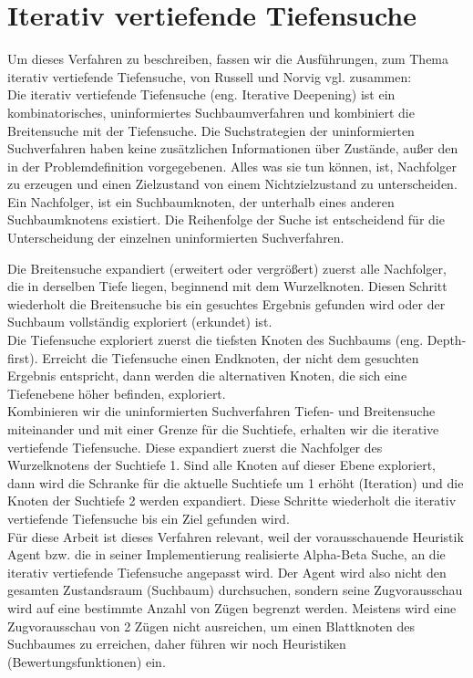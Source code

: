 \section{Iterativ vertiefende Tiefensuche}
\label{sec:Iterativ vertiefende Tiefensuche}
Um dieses Verfahren zu beschreiben, fassen wir die Ausführungen, zum Thema iterativ vertiefende Tiefensuche, von Russell und Norvig vgl. \cite[116]{Russell} zusammen:\\

Die iterativ vertiefende Tiefensuche (eng. Iterative Deepening) ist ein kombinatorisches, uninformiertes Suchbaumverfahren und kombiniert die Breitensuche mit der Tiefensuche. Die Suchstrategien der uninformierten Suchverfahren haben keine zusätzlichen Informationen über Zustände, außer den in der Problemdefinition vorgegebenen. Alles was sie tun können, ist, Nachfolger zu erzeugen und einen Zielzustand von einem Nichtzielzustand zu unterscheiden. Ein Nachfolger, ist ein Suchbaumknoten, der unterhalb eines anderen Suchbaumknotens existiert. Die Reihenfolge der Suche ist entscheidend für die Unterscheidung der einzelnen uninformierten Suchverfahren. \\
\newpage
 
Die Breitensuche expandiert (erweitert oder vergrößert) zuerst alle Nachfolger, die in derselben Tiefe liegen, beginnend mit dem Wurzelknoten. Diesen Schritt wiederholt die Breitensuche bis ein gesuchtes Ergebnis gefunden wird oder der Suchbaum vollständig exploriert (erkundet) ist. \\

Die Tiefensuche exploriert zuerst die tiefsten Knoten des Suchbaums (eng. Depth-first). Erreicht die Tiefensuche einen Endknoten, der nicht dem gesuchten Ergebnis entspricht, dann werden die alternativen Knoten, die sich eine Tiefenebene höher befinden, exploriert. \\

Kombinieren wir die uninformierten Suchverfahren Tiefen- und Breitensuche miteinander und mit einer Grenze für die Suchtiefe, erhalten wir die iterative vertiefende Tiefensuche. Diese expandiert zuerst die Nachfolger des Wurzelknotens der Suchtiefe 1. Sind alle Knoten auf dieser Ebene exploriert, dann wird die Schranke für die aktuelle Suchtiefe um 1 erhöht (Iteration) und die Knoten der Suchtiefe 2 werden expandiert. Diese Schritte wiederholt die iterativ vertiefende Tiefensuche bis ein Ziel gefunden wird. \\  

Für diese Arbeit ist dieses Verfahren relevant, weil der vorausschauende Heuristik Agent bzw. die in seiner Implementierung realisierte Alpha-Beta Suche, an die iterativ vertiefende Tiefensuche angepasst wird. Der Agent wird also nicht den gesamten Zustandsraum (Suchbaum) durchsuchen, sondern seine Zugvorausschau wird auf eine bestimmte Anzahl von Zügen begrenzt werden. Meistens wird eine Zugvorausschau von 2 Zügen nicht ausreichen, um einen Blattknoten des Suchbaumes zu erreichen, daher führen wir noch Heuristiken (Bewertungsfunktionen) ein.\\

